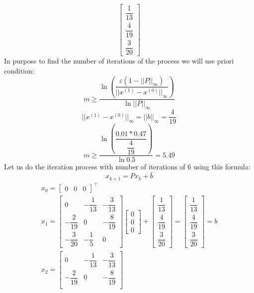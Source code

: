\documentclass[12pt]{report}
\begin{document}
\begin{solution}
\[\begin{bmatrix}
      \dfrac{1}{13}\\[0.5cm]
      \dfrac{4}{19}\\[0.5cm]
      \dfrac{3}{20}\end{bmatrix}\]
   In purpose to find the number of iterations of the process we will use priori condition:
   \[ m \geq \dfrac{\ln\left(\dfrac{\varepsilon\left(1-||P||_{\infty}\right)}
   {||x^{(1)}-x^{(0)}||_{\infty}}\right)}{\ln ||P||_{\infty}}\]  
   \[||x^{(1)}-x^{(0)}||_{\infty}=||b||_{\infty} = \dfrac{4}{19}\]  
   \[ m \geq \dfrac{\ln\left(\dfrac{0.01*0.47}{\dfrac{4}{19}}\right)}{\ln 0.5}=5.49\]
   Let us do the iteration process with number of iterations of 6 using this formula:
   \[ x_{k+1} = P x_k+\bar b\]
   \[
         \begin{array}{c}
            x_0 = \begin{bmatrix}
               0 & 0 & 0
            \end{bmatrix}^\intercal \\[0.5cm]
            x_1 = \begin{bmatrix}
               0 & - \dfrac{1}{13} & - \dfrac{3}{13} \\[0.5cm]
               -\dfrac{2}{19} & 0 & -\dfrac{8}{19} \\[0.5cm] 
               -\dfrac{3}{20} & -\dfrac{1}{5} & 0
            \end{bmatrix}
             \begin{bmatrix}
               0 \\ 0 \\ 0
            \end{bmatrix} 
            + \begin{bmatrix}
               \dfrac{1}{13}\\[0.5cm]
               \dfrac{4}{19}\\[0.5cm]
               \dfrac{3}{20}
            \end{bmatrix} = \begin{bmatrix}
               \dfrac{1}{13}\\[0.5cm]
               \dfrac{4}{19}\\[0.5cm]
               \dfrac{3}{20}
            \end{bmatrix}
             = b \\[2cm]
            x_2 = \begin{bmatrix}
               0 & - \dfrac{1}{13} & - \dfrac{3}{13} \\[0.5cm]
               -\dfrac{2}{19} & 0 & -\dfrac{8}{19} \\[0.5cm] 

\end{bmatrix}
\end{array}\]
\end{solution}
\end{document}
